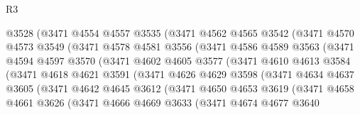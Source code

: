 \begin{lexlean}{R3}
\begin{coremodule}
                  @3528
                  (@3471
                    @4554
                    @4557
                    @3535
                    (@3471
                      @4562
                      @4565
                      @3542
                      (@3471
                        @4570
                        @4573
                        @3549
                        (@3471
                          @4578
                          @4581
                          @3556
                          (@3471
                            @4586
                            @4589
                            @3563
                            (@3471
                              @4594
                              @4597
                              @3570
                              (@3471
                                @4602
                                @4605
                                @3577
                                (@3471
                                  @4610
                                  @4613
                                  @3584
                                  (@3471
                                    @4618
                                    @4621
                                    @3591
                                    (@3471
                                      @4626
                                      @4629
                                      @3598
                                      (@3471
                                        @4634
                                        @4637
                                        @3605
                                        (@3471
                                          @4642
                                          @4645
                                          @3612
                                          (@3471
                                            @4650
                                            @4653
                                            @3619
                                            (@3471
                                              @4658
                                              @4661
                                              @3626
                                              (@3471
                                                @4666
                                                @4669
                                                @3633
                                                (@3471
                                                  @4674
                                                  @4677
                                                  @3640

\end{coremodule}
\end{lexlean}
